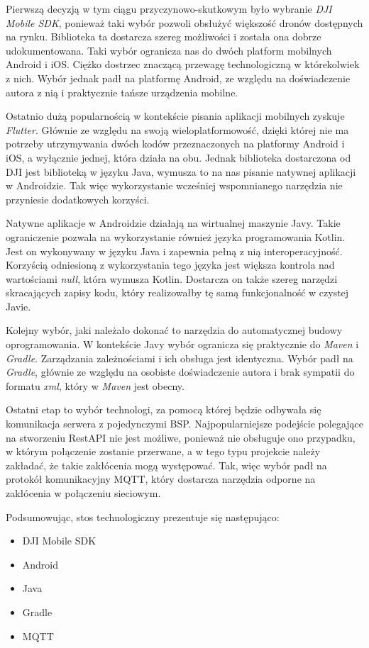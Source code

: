 Pierwszą decyzją w tym ciągu przyczynowo-skutkowym było wybranie \textit{DJI Mobile SDK}, ponieważ taki wybór pozwoli obsłużyć większość dronów dostępnych na rynku. Biblioteka ta dostarcza szereg możliwości i została ona dobrze udokumentowana. Taki wybór ogranicza nas do dwóch platform mobilnych Android i iOS. Ciężko dostrzec znaczącą przewagę technologiczną w którekolwiek z nich. Wybór jednak padł na platformę Android, ze względu na doświadczenie autora z nią i praktycznie tańsze urządzenia mobilne.

Ostatnio dużą popularnością w kontekście pisania aplikacji mobilnych zyskuje \textit{Flutter}. Głównie ze względu na swoją wieloplatformowość, dzięki której nie ma potrzeby utrzymywania dwóch kodów przeznaczonych na platformy Android i iOS, a wyłącznie jednej, która działa na obu. Jednak biblioteka dostarczona od DJI jest biblioteką w języku Java, wymusza to na nas pisanie natywnej aplikacji w Androidzie. Tak więc wykorzystanie wcześniej wspomnianego narzędzia nie przyniesie dodatkowych korzyści.

Natywne aplikacje w Androidzie działają na wirtualnej maszynie Javy. Takie ograniczenie pozwala na wykorzystanie również języka programowania Kotlin. Jest on wykonywany w języku Java i zapewnia pełną z nią interoperacyjność. Korzyścią odniesioną z wykorzystania tego języka jest większa kontrola nad wartościami \textit{null}, która wymusza Kotlin. Dostarcza on także szereg narzędzi skracających zapisy kodu, który realizowałby tę samą funkcjonalność w czystej Javie.

Kolejny wybór, jaki należało dokonać to narzędzia do automatycznej budowy oprogramowania. W kontekście Javy wybór ogranicza się praktycznie do \textit{Maven} i \textit{Gradle}. Zarządzania zależnościami i ich obsługa jest identyczna. Wybór padł na \textit{Gradle}, głównie ze względu na osobiste doświadczenie autora i brak sympatii do formatu \textit{xml}, który w \textit{Maven} jest obecny.

Ostatni etap to wybór technologi, za pomocą której będzie odbywała się komunikacja serwera z pojedynczymi BSP. Najpopularniejsze podejście polegające na stworzeniu RestAPI nie jest możliwe, ponieważ nie obsługuje ono przypadku, w którym połączenie zostanie przerwane, a w tego typu projekcie należy zakładać, że takie zakłócenia mogą występować. Tak, więc wybór padł na protokół komunikacyjny MQTT, który dostarcza narzędzia odporne na zakłócenia w połączeniu sieciowym.

Podsumowując, stos technologiczny prezentuje się następująco:
\begin{itemize}
    \setlength\itemsep{1mm} %
  \item DJI Mobile SDK
  \item Android
  \item Java
  \item Gradle
  \item MQTT
\end{itemize}

